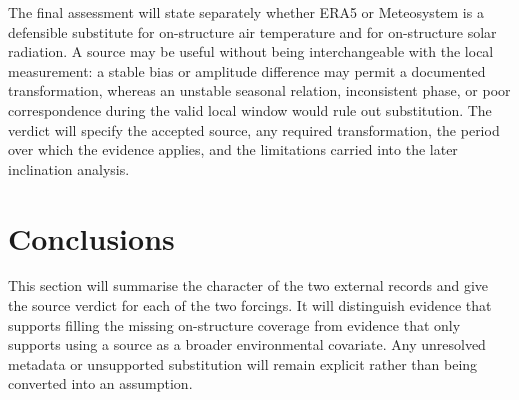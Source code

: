 \documentclass[11pt,a4paper]{article}
\begin{document}
The final assessment will state separately whether ERA5 or Meteosystem is a
defensible substitute for on-structure air temperature and for on-structure
solar radiation. A source may be useful without being interchangeable with the
local measurement: a stable bias or amplitude difference may permit a documented
transformation, whereas an unstable seasonal relation, inconsistent phase, or
poor correspondence during the valid local window would rule out substitution.
The verdict will specify the accepted source, any required transformation, the
period over which the evidence applies, and the limitations carried into the
later inclination analysis.

\section{Conclusions}
\label{sec:conclusions}

This section will summarise the character of the two external records and give
the source verdict for each of the two forcings. It will distinguish evidence
that supports filling the missing on-structure coverage from evidence that only
supports using a source as a broader environmental covariate. Any unresolved
metadata or unsupported substitution will remain explicit rather than being
converted into an assumption.
\end{document}
